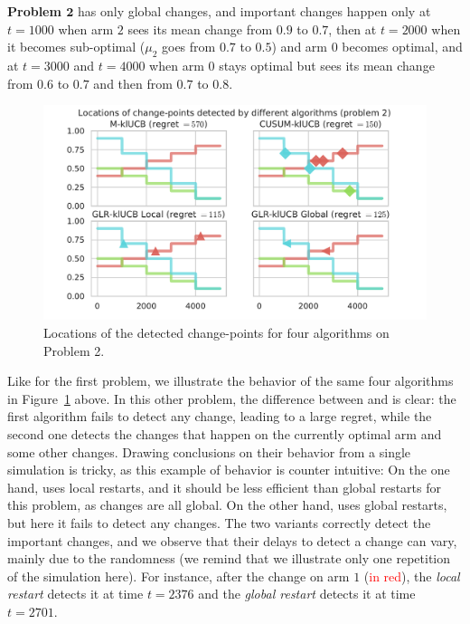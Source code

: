 \textbf{Problem $\bm{2}$} has only global changes, and important changes happen only at $t=1000$ when arm $2$ sees its mean change from $0.9$ to $0.7$, then at $t=2000$ when it becomes sub-optimal ($\mu_2$ goes from $0.7$ to $0.5$) and arm $0$ becomes optimal, and at $t=3000$ and $t=4000$ when arm $0$ stays optimal but sees its mean change from $0.6$ to $0.7$ and then from $0.7$ to $0.8$.

\begin{figure}[h!]  %
    \centering
    \includegraphics[width=1.00\linewidth]{2-Chapters/6-Chapter/Images/Visualizing_locations_of_change_points_for_different_algorithms__4algs_Pb2.pdf}
    \caption{Locations of the detected change-points for four algorithms on Problem 2.}
    \label{fig:6:Visualizing_locations_of_change_points_for_different_algorithms__4algs_Pb2}
\end{figure}

Like for the first problem, we illustrate the behavior of the same four algorithms in Figure~\ref{fig:6:Visualizing_locations_of_change_points_for_different_algorithms__4algs_Pb2} above.
In this other problem, the difference between \MklUCB{} and \CUSUMklUCB{} is clear:
the first algorithm fails to detect any change, leading to a large regret,
while the second one detects the changes that happen on the currently optimal arm and some other changes.
Drawing conclusions on their behavior from a single simulation is tricky, as this example of behavior is counter intuitive:
On the one hand, \CUSUM{} uses local restarts, and it should be less efficient than global restarts for this problem, as changes are all global.
On the other hand, \MklUCB{} uses global restarts, but here it fails to detect any changes.
%
The two \GLRklUCB{} variants correctly detect the important changes, and we observe that their delays to detect a change can vary, mainly due to the randomness (we remind that we illustrate only one repetition of the simulation here).
For instance, after the change on arm $1$ (\textcolor{red}{in red}), the \emph{local restart} detects it at time $t=2376$ and the \emph{global restart} detects it at time $t=2701$.


